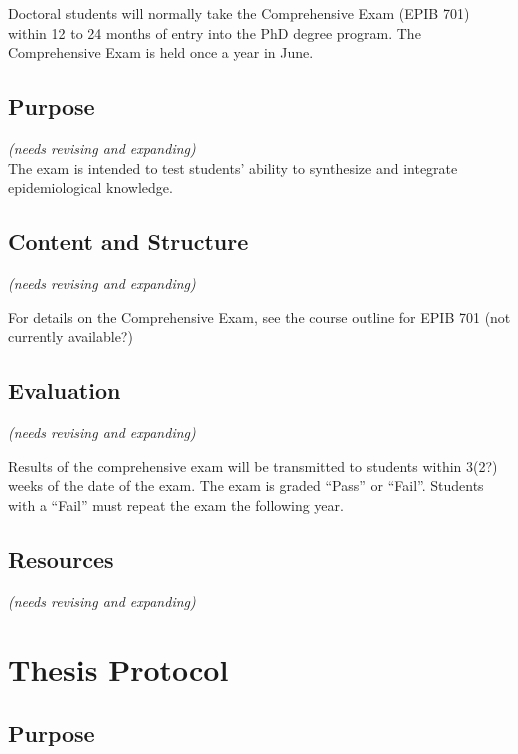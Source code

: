 \documentclass[
]{book}
\begin{document}
Doctoral students will normally take the Comprehensive Exam (EPIB 701) within 12 to 24 months of entry into the PhD degree program. The Comprehensive Exam is held once a year in June.

\hypertarget{purpose}{%
\section{Purpose}\label{purpose}}

\emph{(needs revising and expanding)}\\
The exam is intended to test students' ability to synthesize and integrate epidemiological knowledge.

\hypertarget{content-and-structure}{%
\section{Content and Structure}\label{content-and-structure}}

\emph{(needs revising and expanding)}

For details on the Comprehensive Exam, see the course outline for EPIB 701 (not currently available?)

\hypertarget{evaluation}{%
\section{Evaluation}\label{evaluation}}

\emph{(needs revising and expanding)}

Results of the comprehensive exam will be transmitted to students within 3(2?) weeks of the date of the exam. The exam is graded ``Pass'' or ``Fail''. Students with a ``Fail'' must repeat the exam the following year.

\hypertarget{resources}{%
\section{Resources}\label{resources}}

\emph{(needs revising and expanding)}

\hypertarget{thesis-protocol}{%
\chapter{Thesis Protocol}\label{thesis-protocol}}

\hypertarget{purpose-1}{%
\section{Purpose}\label{purpose-1}}
\end{document}
